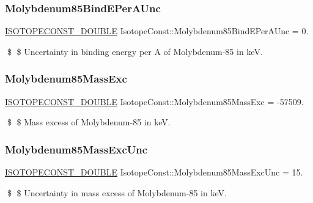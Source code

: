 \subsubsection{\texorpdfstring{Molybdenum85\+Bind\+E\+Per\+A\+Unc}{Molybdenum85BindEPerAUnc}}
{\footnotesize\ttfamily \mbox{\hyperlink{group___isotope_const-_macros_ga8f45a7272ce02c0b4c65c44636ed719a}{I\+S\+O\+T\+O\+P\+E\+C\+O\+N\+S\+T\+\_\+\+D\+O\+U\+B\+LE}} Isotope\+Const\+::\+Molybdenum85\+Bind\+E\+Per\+A\+Unc = 0.}

\$ \$ Uncertainty in binding energy per A of Molybdenum-\/85 in keV. \mbox{\label{group___isotope_const-_molybdenum-_mo85_ga68330f74335fa53d888a7b5dcb446f46}} 
\subsubsection{\texorpdfstring{Molybdenum85\+Mass\+Exc}{Molybdenum85MassExc}}
{\footnotesize\ttfamily \mbox{\hyperlink{group___isotope_const-_macros_ga8f45a7272ce02c0b4c65c44636ed719a}{I\+S\+O\+T\+O\+P\+E\+C\+O\+N\+S\+T\+\_\+\+D\+O\+U\+B\+LE}} Isotope\+Const\+::\+Molybdenum85\+Mass\+Exc = -\/57509.}

\$ \$ Mass excess of Molybdenum-\/85 in keV. \mbox{\label{group___isotope_const-_molybdenum-_mo85_ga4c0d02209627c14699b0c4c35a01b513}} 
\subsubsection{\texorpdfstring{Molybdenum85\+Mass\+Exc\+Unc}{Molybdenum85MassExcUnc}}
{\footnotesize\ttfamily \mbox{\hyperlink{group___isotope_const-_macros_ga8f45a7272ce02c0b4c65c44636ed719a}{I\+S\+O\+T\+O\+P\+E\+C\+O\+N\+S\+T\+\_\+\+D\+O\+U\+B\+LE}} Isotope\+Const\+::\+Molybdenum85\+Mass\+Exc\+Unc = 15.}

\$ \$ Uncertainty in mass excess of Molybdenum-\/85 in keV. \mbox{\label{group___isotope_const-_molybdenum-_mo85_gab765595d82afa3d79d2e4f8b09eb5913}} 
